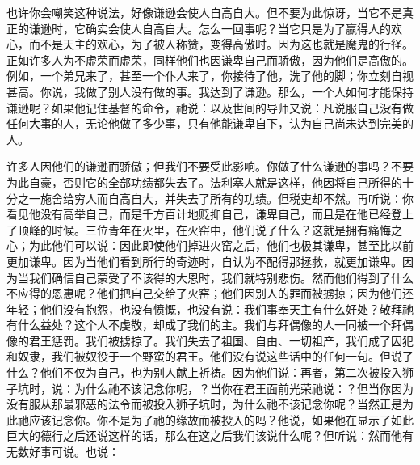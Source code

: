 也许你会嘲笑这种说法，好像谦逊会使人自高自大。但不要为此惊讶，当它不是真正的谦逊时，它确实会使人自高自大。怎么一回事呢？当它只是为了赢得人的欢心，而不是天主的欢心，为了被人称赞，变得高傲时。因为这也就是魔鬼的行径。正如许多人为不虚荣而虚荣，同样他们也因谦卑自己而骄傲，因为他们是高傲的。例如，一个弟兄来了，甚至一个仆人来了，你接待了他，洗了他的脚；你立刻自视甚高。你说，我做了别人没有做的事。我达到了谦逊。那么，一个人如何才能保持谦逊呢？如果他记住基督的命令，祂说：以及世间的导师又说：凡说服自己没有做任何大事的人，无论他做了多少事，只有他能谦卑自下，认为自己尚未达到完美的人。\par

许多人因他们的谦逊而骄傲；但我们不要受此影响。你做了什么谦逊的事吗？不要为此自豪，否则它的全部功绩都失去了。法利塞人就是这样，他因将自己所得的十分之一施舍给穷人而自高自大，并失去了所有的功绩。但税吏却不然。再听说：你看见他没有高举自己，而是千方百计地贬抑自己，谦卑自己，而且是在他已经登上了顶峰的时候。三位青年在火里，在火窑中，他们说了什么？这就是拥有痛悔之心；为此他们可以说：因此即使他们掉进火窑之后，他们也极其谦卑，甚至比以前更加谦卑。因为当他们看到所行的奇迹时，自认为不配得那拯救，就更加谦卑。因为当我们确信自己蒙受了不该得的大恩时，我们就特别悲伤。然而他们得到了什么不应得的恩惠呢？他们把自己交给了火窑；他们因别人的罪而被掳掠；因为他们还年轻；他们没有抱怨，也没有愤慨，也没有说：我们事奉天主有什么好处？敬拜祂有什么益处？这个人不虔敬，却成了我们的主。我们与拜偶像的人一同被一个拜偶像的君王惩罚。我们被掳掠了。我们失去了祖国、自由、一切祖产，我们成了囚犯和奴隶，我们被奴役于一个野蛮的君王。他们没有说这些话中的任何一句。但说了什么？他们不仅为自己，也为别人献上祈祷。因为他们说：再者，第二次被投入狮子坑时，说：为什么祂不该记念你呢，？当你在君王面前光荣祂说：？但当你因为没有服从那最邪恶的法令而被投入狮子坑时，为什么祂不该记念你呢？当然正是为此祂应该记念你。你不是为了祂的缘故而被投入的吗？他说，如果他在显示了如此巨大的德行之后还说这样的话，那么在这之后我们该说什么呢？但听说：然而他有无数好事可说。也说：\par


